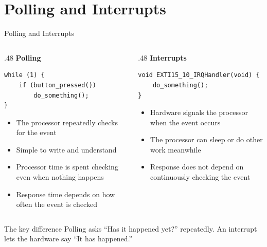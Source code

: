 \documentclass[9pt,aspectratio=169,xcolor=table]{beamer}
\begin{document}
\section{Polling and Interrupts}
\begin{frame}[fragile]{Polling and Interrupts}
	\begin{columns}[T]
		\begin{column}{.48\textwidth}
			\textbf{Polling}

			\vspace{1mm}
			\begin{lstlisting}[style=myc, basicstyle=\ttfamily\small]
while (1) {
	if (button_pressed())
		do_something();
}
			\end{lstlisting}

			\vspace{5mm}
			{\small
				\begin{itemize}\itemsep1pt
					\item The processor \alert{repeatedly checks} for the event
					\item Simple to write and understand
					\item Processor time is spent checking even when nothing happens
					\item Response time depends on how often the event is checked
			\end{itemize}}
		\end{column}

		\begin{column}{.48\textwidth}
			\textbf{Interrupts}

			\vspace{1mm}
			\begin{lstlisting}[style=myc, basicstyle=\ttfamily\small]
void EXTI15_10_IRQHandler(void) {
	do_something();
}
			\end{lstlisting}

			\vspace{5mm}
			{\small
				\begin{itemize}\itemsep1pt
					\item Hardware signals the processor when the event occurs
					\item The processor can sleep or do other work meanwhile
					\item Response does not depend on continuously checking the event
			\end{itemize}}
		\end{column}
	\end{columns}

	\vspace{3mm}
	\begin{block}{The key difference}
		\alert{Polling asks ``Has it happened yet?'' repeatedly.}
		An interrupt lets the hardware say ``It has happened.''
	\end{block}
\end{frame}
\end{document}
